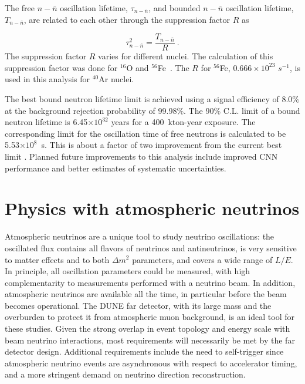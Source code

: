 The free $n-\bar{n}$ oscillation lifetime, $\tau_{n-\bar{n}}$, and bounded $n-\bar{n}$ oscillation lifetime, $T_{n-\bar{n}}$, are related to each other through the suppression factor $R$ as

\begin{equation}
    \tau^{2}_{n-\bar{n}} = \frac{T_{n-\bar{n}}}{R} ~.
    \label{eq:tau}
\end{equation}
The suppression factor $R$ varies for different nuclei. The calculation of this suppression factor was done for $^{16}$O and $^{56}$Fe~\cite{Friedman:2008es}. The $R$ for $^{56}$Fe, $0.666\times10^{23}$ $s^{-1}$, is used in this analysis for $^{40}$Ar nuclei.

The best bound neutron lifetime limit is achieved using a signal efficiency of 8.0$\%$ at the background rejection probability of 99.98$\%$. The 90$\%$ C.L. limit of a bound neutron lifetime is 6.45$\times 10^{32}$ years for a 400~kton-year exposure. The corresponding  limit for the oscillation time of free neutrons is calculated to be 5.53$\times 10^{8}$~s. This is about a factor of two improvement from the current best limit \cite{Abe:2011ky}.  Planned future improvements to this analysis include improved CNN performance and better estimates of systematic uncertainties.

\section{Physics with atmospheric neutrinos}
\label{sec:nonaccel-atm}

Atmospheric neutrinos are a unique tool to study neutrino oscillations: the oscillated flux contains all flavors of neutrinos and antineutrinos, is very sensitive to matter effects and to both $\Delta m^2$ parameters, and covers a wide range of $L/E$. In principle, all oscillation parameters could be measured, with high
complementarity to measurements performed with a neutrino beam. In addition, atmospheric neutrinos are available all the time, in particular before the beam becomes operational. The DUNE far detector, with its large mass and the overburden to protect it from atmospheric muon background, is an ideal tool for these studies.  Given the strong overlap in event topology and energy scale with beam neutrino interactions, most requirements will necessarily be met by the far detector design. Additional requirements include the need to self-trigger since atmospheric neutrino events are asynchronous with respect to accelerator timing, and a more stringent demand on neutrino direction reconstruction.

